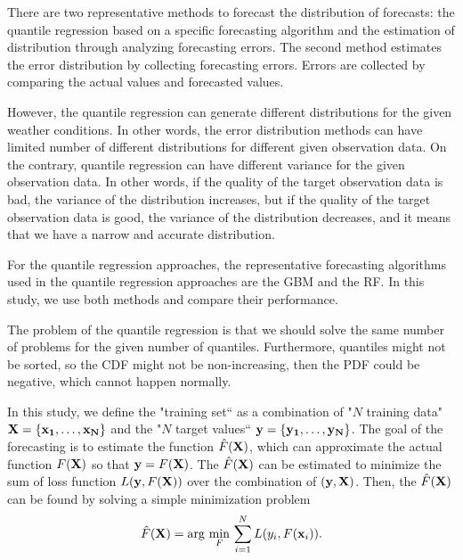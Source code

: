 \documentclass[journal]{IEEEtran} %
\begin{document}
There are two representative methods to forecast the distribution of forecasts: the quantile regression based on a specific forecasting algorithm and the estimation of distribution through analyzing forecasting errors. 
%
The second method estimates the error distribution by collecting forecasting errors. Errors are collected by comparing the actual values and forecasted values. 

However, the quantile regression can generate different distributions for the given weather conditions. In other words, the error distribution methods can have limited number of different distributions for different given observation data. On the contrary, quantile regression can have different variance for the given observation data. In other words, if the quality of the target observation data is bad, the variance of the distribution increases, but if the quality of the target observation data is good, the variance of the distribution decreases, and it means that we have a narrow and accurate distribution.


For the quantile regression approaches, the representative forecasting algorithms used in the quantile regression approaches are the GBM and the RF. In this study, we use both methods and compare their performance.

The problem of the quantile regression is that we should solve the same number of problems for the given number of quantiles. Furthermore, quantiles might not be sorted, so the CDF might not be non-increasing, then the PDF could be negative, which cannot happen normally.



In this study, we define the "training set`` as a combination of "$N$ training data" $ \bf{X}=\left\{ {{{\bf{x}}_1}, \ldots ,{{\bf{x}}_N}} \right\}$ and the "$N$ target values`` $\bf{y} = \left\{ {{y_1}, \ldots ,{y_N}} \right\}$. The goal of the forecasting is to estimate the function $\hat{F}(\bf{X})$, which can approximate the actual function $F(\bf{X})$ so that ${\bf{y}} = F(\bf{X})$. The $\hat{F}(\bf{X})$ can be estimated to minimize the sum of loss function $L({\bf{y}}, F(\bf{X}) )$ over the combination of $( {\bf{y}}, {\bf{X}})$. Then, the $\hat{F}(\bf{X})$ can be found by solving a simple minimization problem
\begin{equation}
\label{GBMobject}
\hat F({\bf{X}}) = \arg \,\mathop {\min }\limits_F \,\sum\limits_{i = 1}^N {L({y_i},F({{\bf{x}}_i}))}.
\end{equation}
\end{document}
